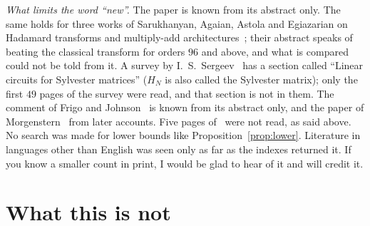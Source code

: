 \documentclass[10pt]{article}
\theoremstyle{remark}
\begin{document}
\emph{What limits the word ``new''.} The paper
\cite{Samadi} is known from its abstract only. The same holds for three works of Sarukhanyan, Agaian, Astola and
Egiazarian on Hadamard transforms and multiply-add architectures~\cite{SAAE03,SAAE05,ASEA}; their abstract
speaks of beating the classical transform for orders $96$ and above, and what is compared could not be told
from it.
A survey by I.~S.~Sergeev~\cite{Sergeev} has a section called ``Linear circuits for Sylvester matrices''
($H_N$ is also called the Sylvester matrix); only the first $49$ pages of the survey were read, and that
section is not in them. The comment of Frigo and Johnson~\cite{FJ} is known from its abstract only, and
the paper of Morgenstern~\cite{Morgenstern} from later accounts. Five pages of~\cite{GA} were not read, as
said above. No search was made for lower bounds like Proposition~\ref{prop:lower}. Literature in
languages other than English was seen only as far as the indexes returned it. If you
know a smaller count in print, I would be glad to hear of it and will credit it.

\section{What this is not}\label{sec:not}
\end{document}
